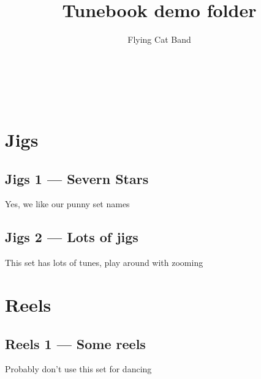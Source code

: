 \documentclass[a4paper,11pt]{article}
\begin{document}
\title{Tunebook demo folder}
\author{Flying Cat Band}

\makeatletter
\begin{titlepage}
    \begin{center}
        {\huge \bfseries  \@title }\\[2ex]
        {\LARGE  \@author}\\[50ex]
    \end{center}
\end{titlepage}
\makeatother
\thispagestyle{empty}
\newpage

\maketitle
\tableofcontents
\clearpage

\setcounter{page}{1} %

\section{Jigs}

\subsection{Jigs 1 --- Severn Stars}
Yes, we like our punny set names
\clearpage

\subsection{Jigs 2 --- Lots of jigs}
This set has lots of tunes, play around with zooming
\clearpage

\section{Reels}
\subsection{Reels 1 --- Some reels}
Probably don't use this set for dancing
\end{document}
